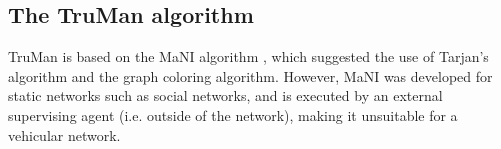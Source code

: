 \documentclass[conference]{IEEEtran}
\begin{document}
%

%
%
%
%

\subsection{The TruMan algorithm}
\label{section:trustmanagement}





TruMan is based on the MaNI algorithm \cite{vernize2015malicious}, which suggested the use of Tarjan's algorithm and the graph coloring algorithm.
However, MaNI was developed for static networks such as social networks, and is executed by an external supervising agent (i.e. outside of the network), making it unsuitable for a vehicular network.
\end{document}
